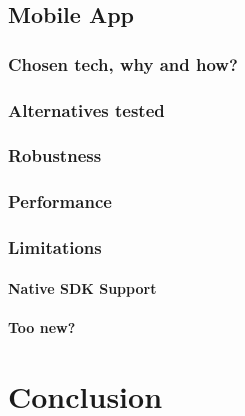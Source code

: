 \section{Mobile App}
\subsection{Chosen tech, why and how?}

\subsection{Alternatives tested}

\subsection{Robustness}

\subsection{Performance}

\subsection{Limitations}
\subsubsection{Native SDK Support}
\subsubsection{Too new?}

\chapter{Conclusion}	%

